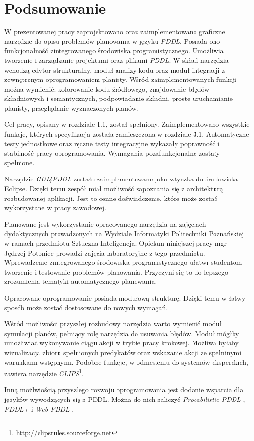 \chapter{Podsumowanie}
\label{sec:podsumowanie}
W prezentowanej pracy zaprojektowano oraz zaimplementowano graficzne narzędzie do opisu problemów planowania
w języku \emph{PDDL}.
Posiada ono funkcjonalność zintegrowanego środowiska programistycznego. Umożliwia tworzenie i zarządzanie
projektami oraz plikami \emph{PDDL}. W skład narzędzia wchodzą edytor strukturalny, moduł analizy kodu oraz moduł
integracji z zewnętrznym oprogramowaniem planisty. Wśród zaimplementowanych funkcji można wymienić: kolorowanie kodu źródłowego, znajdowanie błędów składniowych i semantycznych,
podpowiadanie składni, proste uruchamianie planisty, przeglądanie wyznaczonych planów.

Cel pracy, opisany w rozdziale 1.1, został spełniony. Zaimplementowano wszystkie funkcje, których specyfikacja
została zamieszczona w rozdziale 3.1. Automatyczne testy jednostkowe oraz ręczne testy integracyjne wykazały
poprawność i stabilność pracy oprogramowania. Wymagania pozafunkcjonalne zostały spełnione.

Narzędzie \emph{GUI4PDDL} zostało zaimplementowane jako wtyczka do środowiska Eclipse. Dzięki temu 
zespół miał możliwość zapoznania się z architekturą rozbudowanej aplikacji. Jest to cenne doświadczenie,
które może zostać wykorzystane w pracy zawodowej.

Planowane jest wykorzystanie opracowanego narzędzia na zajęciach dydaktycznych prowadzonych na Wydziale 
Informatyki Politechniki Poznańskiej w ramach przedmiotu Sztuczna Inteligencja. Opiekun niniejszej pracy mgr Jędrzej
Potoniec prowadzi zajęcia laboratoryjne z tego przedmiotu. Wprowadzenie zintegrowanego środowiska programistycznego
ułatwi studentom tworzenie i testowanie problemów planowania. Przyczyni się to do lepszego zrozumienia tematyki
automatycznego planowania.

Opracowane oprogramowanie posiada modułową strukturę. Dzięki temu w łatwy sposób może zostać dostosowane do 
nowych wymagań.

Wśród możliwości przyszłej rozbudowy narzędzia warto wymienić moduł symulacji planów, pełniący rolę narzędzia
do usuwania błędów. Moduł mógłby umożliwiać wykonywanie ciągu akcji w trybie pracy krokowej.
Możliwa byłaby wizualizacja zbioru spełnionych predykatów oraz wskazanie akcji ze spełninymi warunkami wstępnymi.
Podobne funkcje, w odniesieniu do systemów eksperckich, zawiera narzędzie \emph{CLIPS}\footnote{http://clipsrules.sourceforge.net}.

Inną możlwiością przyszłego rozwoju oprogramowania jest dodanie wsparcia dla języków wywodzących się z PDDL.
Można do nich zaliczyć \emph{Probabilistic PDDL} \cite{ppddl}, \emph{PDDL+} \cite{pddlplus} i \emph{Web-PDDL}
\cite{webpddl}. 

